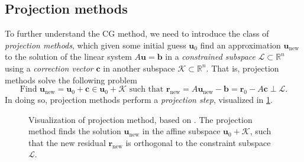 \subsection{Projection methods}
To further understand the CG method, we need to introduce the class of \textit{projection methods}, which given some initial guess $\mathbf{u}_0$ find an approximation $\mathbf{u}_{\text{new}}$ to the solution of the linear system $A\mathbf{u} = \mathbf{b}$ in a \textit{constrained subspace} $\mathcal{L}\subset\mathbb{R}^n$ using a \textit{correction vector} $\mathbf{c}$ in another subspace $\mathcal{K}\subset\mathbb{R}^n$. That is, projection methods solve the following problem \cite[Equation 5.3]{iter_method_saad}
\[
  \text{Find } \mathbf{u}_{\text{new}} = \mathbf{u}_0 + \mathbf{c} \in \mathbf{u}_0 + \mathcal{K} \text{ such that } \mathbf{r}_{\text{new}} =  A\mathbf{u}_{\text{new}} - \mathbf{b} = \mathbf{r}_0 - A\mathbf{c} \perp \mathcal{L}.
\]
In doing so, projection methods perform a \textit{projection step}, visualized in \cref{fig:projection_method}.
\begin{figure}[H]
  \centering
  
  \caption{Visualization of projection method, based on \cite[Figure 5.1]{iter_method_saad}. The projection method finds the solution $\mathbf{u}_{\text{new}}$ in the affine subspace $\mathbf{u}_0 + \mathcal{K}$, such that the new residual $\mathbf{r}_{\text{new}}$ is orthogonal to the constraint subspace $\mathcal{L}$.}
  \label{fig:projection_method}
\end{figure}

